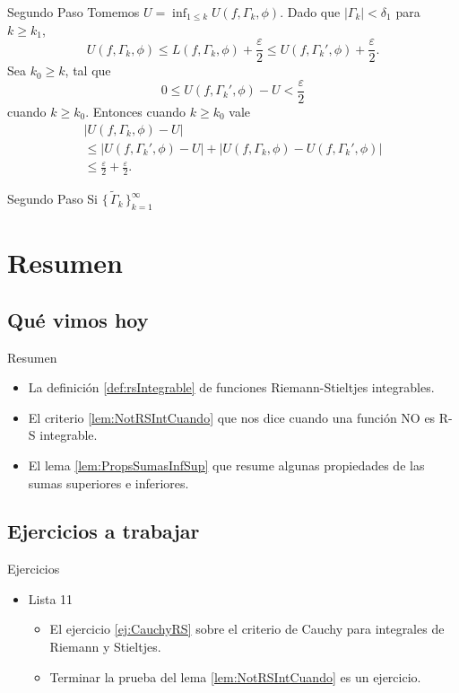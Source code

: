 \documentclass[utf8]{beamer}
\theoremstyle{plain}
\theoremstyle{definition}
\theoremstyle{remark}
\numberwithin{equation}{section}
\newcommand{\dl}{\delta}                %
\newcommand{\eps}{\varepsilon}          %
\newcommand{\Ga}{\Gamma}                %
\newcommand{\set}[1]{\{\,#1\,\}}    %
\renewcommand{\geq}{\geqslant}          %
\renewcommand{\leq}{\leqslant}          %
\newcommand{\suck}{_{k=1}^\infty} %
\renewcommand{\.}{\Cdot}                %
\begin{document}
\begin{frame}{Segundo Paso}
    Tomemos $U=\inf_{1\leq k}U(f,\Ga_k,\phi)$. Dado que $|\Ga_k|<\dl_1$ para $k\geq k_1$, 
    $$U(f,\Ga_k,\phi)\leq L(f,\Ga_k,\phi)+\frac\eps2\leq U(f,\Ga_k',\phi)+\frac{\eps}{2}.$$
  Sea $k_0\geq k$, tal que 
  $$0\leq U(f,\Ga_k',\phi)-U<\frac\eps2$$
  cuando $k\geq k_0$. Entonces cuando $k\geq k_0$ vale
  \begin{gather*}
    |U(f,\Ga_k,\phi)-U|\\
    \leq |U(f,\Ga_k',\phi)-U|+|U(f,\Ga_k,\phi)-U(f,\Ga_k',\phi)|\\
    \leq \frac{\eps}{2}+\frac{\eps}{2}.
  \end{gather*}
     \end{frame}

\begin{frame}{Segundo Paso}
  Si $\set{\tilde\Ga_k}\suck$
\end{frame}
\section*{Resumen}

\subsection*{Qu\'e vimos hoy}

\begin{frame}{Resumen}

  \begin{itemize}
  \item La definición \ref{def:rsIntegrable} de funciones Riemann-Stieltjes integrables.
  \item El criterio \ref{lem:NotRSIntCuando} que nos dice cuando una función NO es R-S integrable.
  \item El lema \ref{lem:PropsSumasInfSup} que resume algunas propiedades de las sumas superiores e inferiores.
  \end{itemize}
  
\end{frame}

\subsection*{Ejercicios a trabajar}
\begin{frame}{Ejercicios}
    
  \begin{itemize}
    \item
      Lista 11
      \begin{itemize}
      \item El ejercicio \ref{ej:CauchyRS} sobre el criterio de Cauchy para integrales de Riemann y Stieltjes.
      \item Terminar la prueba del lema \ref{lem:NotRSIntCuando} es un ejercicio.
      \end{itemize}
    \end{itemize}
  
\end{frame}
\end{document}
